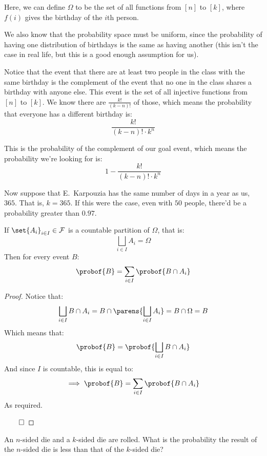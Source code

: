 \begin{blankpp}

Here, we can define $\Omega$ to be the set of all functions from $[n]$ to $[k]$, where $f(i)$ gives the birthday of
the $i$th person.

We also know that the probability space must be uniform, since the probability of having one distribution of birthdays is
the same as having another (this isn't the case in real life, but this is a good enough assumption for us).

Notice that the event that there are at least two people in the class with the same birthday is the complement of the
event that no one in the class shares a birthday with anyone else.
This event is the set of all injective functions from $[n]$ to $[k]$.
We know there are $\frac{k!}{(k-n)!}$ of those, which means the probability that everyone has a different birthday is:
\[ \frac{k!}{(k-n)!\cdot k^n} \]

This is the probability of the complement of our goal event, which means the probability we're looking for is:
\[ 1 - \frac{k!}{(k-n)!\cdot k^n} \]

Now suppose that E.~Karpouzia has the same number of days in a year as us, $365$.
That is, $k=365$.
If this were the case, even with $50$ people, there'd be a probability greater than $0.97$.

\end{blankpp}

\begin{thrm*}

If $\set{A_i}_{i\in I}\in\cF$ is a countable partition of $\Omega$, that is:
\[ \bigsqcup_{i\in I} A_i = \Omega \]
Then for every event $B$:
\[ \probof{B} = \sum_{i\in I}\probof{B\cap A_i} \]

\end{thrm*}

\begin{proof}

Notice that:
\[ \bigsqcup_{i\in I}B\cap A_i = B\cap\parens{\bigsqcup_{i\in I} A_i} = B\cap\Omega = B \]
Which means that:
\[ \probof{B} = \probof{\bigsqcup_{i\in I} B\cap A_i} \]
And since $I$ is countable, this is equal to:
\[ \implies \probof{B} = \sum_{i\in I}\probof{B\cap A_i} \]
As required.

\hfill$\qed$

\end{proof}

\begin{exam}

An $n$-sided die and a $k$-sided die are rolled.
What is the probability the result of the $n$-sided die is less than that of the $k$-sided die?

\end{exam}

